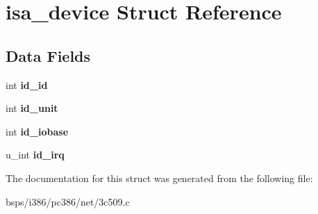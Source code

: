 \hypertarget{structisa__device}{}\section{isa\+\_\+device Struct Reference}
\label{structisa__device}
\subsection*{Data Fields}
\begin{DoxyCompactItemize}
\item 
\mbox{\label{structisa__device_a290873f9501331badc2f0057d3813642}} 
int {\bfseries id\+\_\+id}
\item 
\mbox{\label{structisa__device_aa25ae7263598da5b26dc5226c519dda8}} 
int {\bfseries id\+\_\+unit}
\item 
\mbox{\label{structisa__device_a4fab1a2cc06b619b9bc575c3ef5ddaaa}} 
int {\bfseries id\+\_\+iobase}
\item 
\mbox{\label{structisa__device_a2b9a825914fc8683e294e2b0ccbf161d}} 
u\+\_\+int {\bfseries id\+\_\+irq}
\end{DoxyCompactItemize}


The documentation for this struct was generated from the following file\+:\begin{DoxyCompactItemize}
\item 
bsps/i386/pc386/net/3c509.\+c\end{DoxyCompactItemize}
